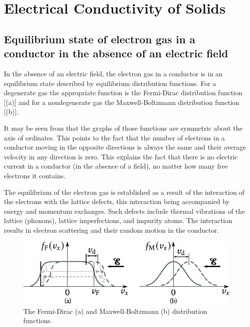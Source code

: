 

\chapter[Electrical Conductivity of Solids]{Electrical Conductivity of Solids}\label{chap:6}

\section{Equilibrium state of electron gas in a conductor in the absence of an electric field}\label{sec:47}

In the absence of an electric field, the electron gas in a conductor is in an equilibrium state described by equilibrium distribution functions. For a degenerate gas the appropriate function is the Fermi-Dirac distribution function [(a)] and for a nondegenerate gas the Maxwell-Boltzmann distribution function [(b)].

It may be seen from  that the graphs of those functions are symmetric about the axis of ordinates. This points to the fact that the number of electrons in a conductor moving in the opposite directions is always the same and their average velocity in any direction is zero. This explains the fact that there is no electric current in a conductor (in the absence of a field), no matter how many free electrons it contains.

The equilibrium of the electron gas is established as a result of the interaction of the electrons with the lattice defects, this interaction being accompanied by energy and momentum exchanges. Such defects include thermal vibrations of the lattice (phonons), lattice imperfections, and impurity atoms. The interaction results in electron scattering and their random motion in the conductor.

\begin{figure}[t]
	\begin{center}
		\includegraphics[scale=1]{figures/ch_06/fig_6_1.pdf}
		\caption[]{The Fermi-Dirac (a) and Maxwell-Boltzmann (b) distribution functions.}
		\label{fig:6_1}
	\end{center}
	\vspace{-0.7cm}
\end{figure}

